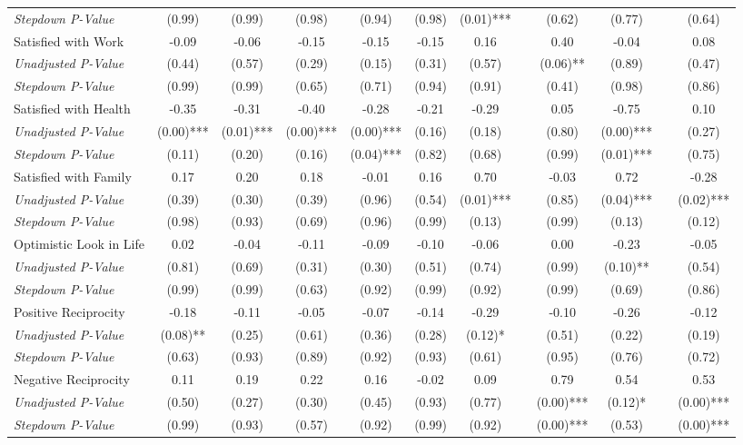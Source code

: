 \begin{tabular}{l c c c c c c c c c c c}
\quad \textit{Stepdown P-Value} & (0.99) & (0.99) & (0.98) & (0.94) & (0.98) & (0.01)*** & & (0.62) & (0.77) & & (0.64) \\
Satisfied with Work & -0.09 & -0.06 & -0.15 & -0.15 & -0.15 & 0.16 & & 0.40 & -0.04 & & 0.08 \\
\quad \textit{Unadjusted P-Value} & (0.44) & (0.57) & (0.29) & (0.15) & (0.31) & (0.57) & & (0.06)** & (0.89) & & (0.47) \\
\quad \textit{Stepdown P-Value} & (0.99) & (0.99) & (0.65) & (0.71) & (0.94) & (0.91) & & (0.41) & (0.98) & & (0.86) \\
Satisfied with Health & -0.35 & -0.31 & -0.40 & -0.28 & -0.21 & -0.29 & & 0.05 & -0.75 & & 0.10 \\
\quad \textit{Unadjusted P-Value} & (0.00)*** & (0.01)*** & (0.00)*** & (0.00)*** & (0.16) & (0.18) & & (0.80) & (0.00)*** & & (0.27) \\
\quad \textit{Stepdown P-Value} & (0.11) & (0.20) & (0.16) & (0.04)*** & (0.82) & (0.68) & & (0.99) & (0.01)*** & & (0.75) \\
Satisfied with Family & 0.17 & 0.20 & 0.18 & -0.01 & 0.16 & 0.70 & & -0.03 & 0.72 & & -0.28 \\
\quad \textit{Unadjusted P-Value} & (0.39) & (0.30) & (0.39) & (0.96) & (0.54) & (0.01)*** & & (0.85) & (0.04)*** & & (0.02)*** \\
\quad \textit{Stepdown P-Value} & (0.98) & (0.93) & (0.69) & (0.96) & (0.99) & (0.13) & & (0.99) & (0.13) & & (0.12) \\
Optimistic Look in Life & 0.02 & -0.04 & -0.11 & -0.09 & -0.10 & -0.06 & & 0.00 & -0.23 & & -0.05 \\
\quad \textit{Unadjusted P-Value} & (0.81) & (0.69) & (0.31) & (0.30) & (0.51) & (0.74) & & (0.99) & (0.10)** & & (0.54) \\
\quad \textit{Stepdown P-Value} & (0.99) & (0.99) & (0.63) & (0.92) & (0.99) & (0.92) & & (0.99) & (0.69) & & (0.86) \\
Positive Reciprocity & -0.18 & -0.11 & -0.05 & -0.07 & -0.14 & -0.29 & & -0.10 & -0.26 & & -0.12 \\
\quad \textit{Unadjusted P-Value} & (0.08)** & (0.25) & (0.61) & (0.36) & (0.28) & (0.12)* & & (0.51) & (0.22) & & (0.19) \\
\quad \textit{Stepdown P-Value} & (0.63) & (0.93) & (0.89) & (0.92) & (0.93) & (0.61) & & (0.95) & (0.76) & & (0.72) \\
Negative Reciprocity & 0.11 & 0.19 & 0.22 & 0.16 & -0.02 & 0.09 & & 0.79 & 0.54 & & 0.53 \\
\quad \textit{Unadjusted P-Value} & (0.50) & (0.27) & (0.30) & (0.45) & (0.93) & (0.77) & & (0.00)*** & (0.12)* & & (0.00)*** \\
\quad \textit{Stepdown P-Value} & (0.99) & (0.93) & (0.57) & (0.92) & (0.99) & (0.92) & & (0.00)*** & (0.53) & & (0.00)*** \\
\bottomrule
\end{tabular}
